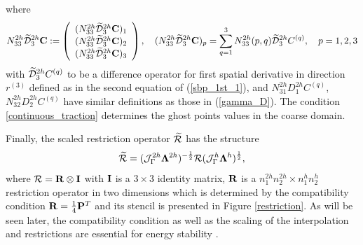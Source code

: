 where 
\begin{align*}
{N}_{33}^{2h}\widetilde{\mathcal{D}}_3^{2h}{\bf C} := \left(\begin{array}{c}
({N}_{33}^{2h}\widetilde{\mathcal{D}}_3^{2h}{\bf C})_1 \\
({N}_{33}^{2h}\widetilde{\mathcal{D}}_3^{2h}{\bf C})_2 \\
({N}_{33}^{2h}\widetilde{\mathcal{D}}_3^{2h}{\bf C})_3 
\end{array}\right), \quad ({N}_{33}^{2h}\widetilde{\mathcal{D}}_3^{2h}{\bf C})_p = \sum_{q = 1}^{3} N_{33}^{2h}(p,q)\widetilde{\mathcal{D}}_3^{2h}{C}^{(q)},\quad p = 1,2,3
\end{align*}
with $\widetilde{\mathcal{D}}_3^{2h}{C}^{(q)}$ to be a difference operator for first spatial derivative in direction $r^{(3)}$ defined as in the second equation of (\ref{sbp_1st_1}), and $N_{31}^{2h}{D}_1^{2h}{C}^{(q)}$, $N_{32}^{2h}{D}_2^{2h}{C}^{(q)}$ have similar definitions as those in (\ref{gamma_D}). The condition \eqref{continuous_traction} determines the ghost points values in the coarse domain. 

Finally, the scaled restriction operator $\widetilde{\mathcal{R}} $ has the structure 
 \[\widetilde{\mathcal{R}} =  (\mathcal{J}^{2h}_\Gamma \bm{\Lambda}^{2h})^{-\frac{1}{2}}\mathcal{R}(\mathcal{J}^{h}_\Gamma \bm{\Lambda}^h)^{\frac{1}{2}},\]
 where $\mathcal{R} = {\bf R}\otimes {\bf I}$ with ${\bf I}$ is a $3\times3$ identity matrix, ${\bf R}$ is a $n_1^{2h}n_2^{2h}\times n_1^hn_2^h$ restriction operator in two dimensions which is determined by the compatibility condition ${\bf R}=\frac{1}{4}{\bf P}^T$ and its stencil is presented in Figure \ref{restriction}. As will be seen later, the compatibility condition as well as the scaling of the interpolation and restrictions are essential for energy stability \cite{Lundquist2018}.

